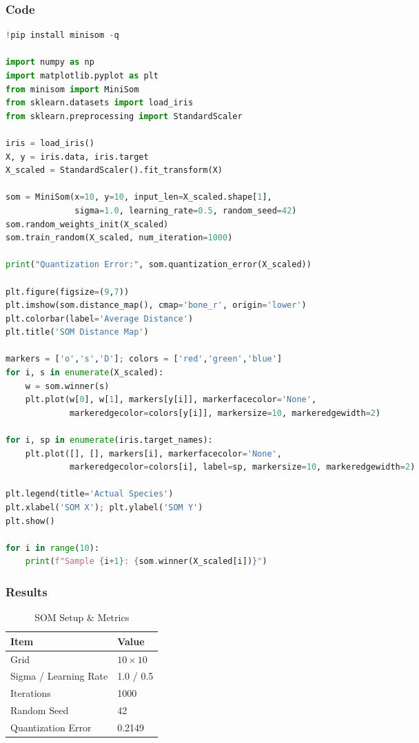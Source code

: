 \documentclass[a4paper,10pt]{article}
\begin{document}
\subsubsection{Code}
\begin{lstlisting}[language=Python, caption={SOM Implementation}]
!pip install minisom -q

import numpy as np
import matplotlib.pyplot as plt
from minisom import MiniSom
from sklearn.datasets import load_iris
from sklearn.preprocessing import StandardScaler

iris = load_iris()
X, y = iris.data, iris.target
X_scaled = StandardScaler().fit_transform(X)

som = MiniSom(x=10, y=10, input_len=X_scaled.shape[1],
              sigma=1.0, learning_rate=0.5, random_seed=42)
som.random_weights_init(X_scaled)
som.train_random(X_scaled, num_iteration=1000)

print("Quantization Error:", som.quantization_error(X_scaled))

plt.figure(figsize=(9,7))
plt.imshow(som.distance_map(), cmap='bone_r', origin='lower')
plt.colorbar(label='Average Distance')
plt.title('SOM Distance Map')

markers = ['o','s','D']; colors = ['red','green','blue']
for i, s in enumerate(X_scaled):
    w = som.winner(s)
    plt.plot(w[0], w[1], markers[y[i]], markerfacecolor='None',
             markeredgecolor=colors[y[i]], markersize=10, markeredgewidth=2)

for i, sp in enumerate(iris.target_names):
    plt.plot([], [], markers[i], markerfacecolor='None',
             markeredgecolor=colors[i], label=sp, markersize=10, markeredgewidth=2)

plt.legend(title='Actual Species')
plt.xlabel('SOM X'); plt.ylabel('SOM Y')
plt.show()

for i in range(10):
    print(f"Sample {i+1}: {som.winner(X_scaled[i])}")
\end{lstlisting}

\subsubsection{Results}
\begin{table}[H]
\centering
\caption{SOM Setup \& Metrics}
\begin{tabular}{ll}
\toprule
\textbf{Item} & \textbf{Value} \\
\midrule
Grid & \(10\times10\) \\
Sigma / Learning Rate & 1.0 / 0.5 \\
Iterations & 1000 \\
Random Seed & 42 \\
Quantization Error & 0.2149 \\
\bottomrule
\end{tabular}
\end{table}
\end{document}

